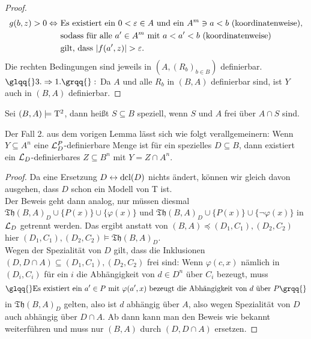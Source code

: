 \begin{proof}
\begin{align*}
	g(b,z)>0\Leftrightarrow\ &\text{Es existiert ein }0<\varepsilon\in A\text{ und ein }A^m\ni a<b\text{ (koordinatenweise),}\\&\text{sodass für alle }a'\in A^m\text{ mit }a<a'<b\text{ (koordinatenweise)}\\&\text{gilt, dass }{\left| f(a',z) \right|}>\varepsilon.
	\end{align*}
	Die rechten Bedingungen sind jeweils in $(A,(R_b)_{b\in B})$ definierbar.\\
	$\glqq{}3.\Rightarrow 1.\grqq{}:$ Da $A$ und alle $R_b$ in $(B,A)$ definierbar sind, ist $Y$ auch in $(B,A)$ definierbar.
\end{proof}

\begin{definition}
	Sei $(B,A)\models\operatorname{T^2}$, dann heißt $S\subseteq B$ speziell, wenn $S$ und $A$ frei über $A\cap S$ sind.
\end{definition}

\begin{lemma}\label{Definierbare Mengen Spezialität}
	Der Fall 2. aus dem vorigen Lemma lässt sich wie folgt verallgemeinern: Wenn $Y\subseteq A^n$ eine $\mathcal{L}^P_D$-definierbare Menge ist für ein spezielles $D\subseteq B$, dann existiert ein $\mathcal{L}_D$-definierbares $Z\subseteq B^n$ mit $Y=Z\cap A^n$.
\end{lemma}
\begin{proof}
	Da eine Ersetzung $D\leftrightarrow\operatorname{dcl}(D)$ nichts ändert, können wir gleich davon ausgehen, dass $D$ schon ein Modell von T ist.\\
	Der Beweis geht dann analog, nur müssen diesmal $\mathfrak{Th}(B,A)_D\cup\{P(x)\}\cup\{\varphi(x)\}$ und $\mathfrak{Th}(B,A)_D\cup\{P(x)\}\cup\{\neg\varphi(x)\}$ in $\mathcal{L}_D$ getrennt werden. Das ergibt anstatt von $(B,A)\preceq(D_1,C_1),(D_2,C_2)$ hier $(D_1,C_1),(D_2,C_2)\models\mathfrak{Th}(B,A)_D$.\\
	Wegen der Spezialität von $D$ gilt, dass die Inklusionen $(D,D\cap A)\subseteq(D_1,C_1),(D_2,C_2)$ frei sind: Wenn $\varphi(c,x)$ nämlich in $(D_i,C_i)$ für ein $i$ die Abhängigkeit von $d\in D^n$ über $C_i$ bezeugt, muss $$\glqq{}\text{Es existiert ein }a'\in P\text{ mit }\varphi(a',x)\text{ bezeugt die Abhängigkeit von }d\text{ über }P\grqq{}$$ in $\mathfrak{Th}(B,A)_D$ gelten, also ist $d$ abhängig über $A$, also wegen Spezialität von $D$ auch abhängig über $D\cap A$. Ab dann kann man den Beweis wie bekannt weiterführen und muss nur $(B,A)$ durch $(D,D\cap A)$ ersetzen.
\end{proof}

